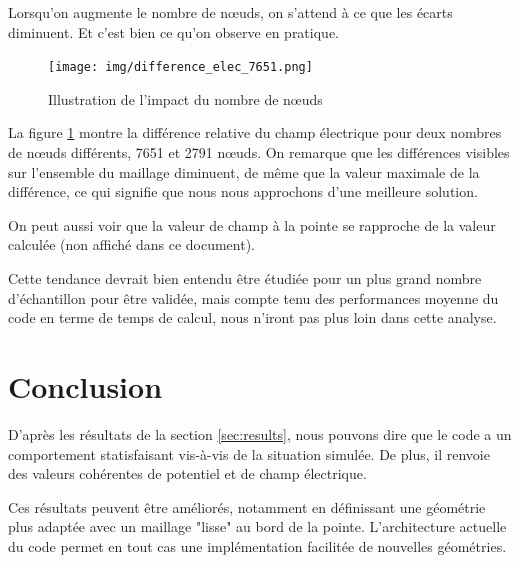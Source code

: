 \documentclass{article}
\begin{document}
Lorsqu'on augmente le nombre de nœuds, on s'attend à ce que les écarts
diminuent. Et c'est bien ce qu'on observe en pratique.

\begin{figure}[!h]
    \centering
    \texttt{[image: img/difference\_elec\_7651.png]}
    \caption{Illustration de l'impact du nombre de nœuds}
    \label{fig:nodes_number_impact}
\end{figure}

La figure \ref{fig:nodes_number_impact} montre la différence
relative du champ électrique pour deux nombres de nœuds
différents, 7651 et 2791 nœuds. On remarque que les
différences visibles sur l'ensemble du maillage diminuent,
de même que la valeur maximale de la différence, ce qui
signifie que nous nous approchons d'une meilleure solution.

On peut aussi voir que la valeur de champ à la pointe
se rapproche de la valeur calculée (non affiché dans ce document).

Cette tendance devrait bien entendu être étudiée pour un
plus grand nombre d'échantillon pour être validée,
mais compte tenu des performances moyenne du code
en terme de temps de calcul, nous
n'iront pas plus loin dans cette analyse.

\newpage

\section{Conclusion}

D'après les résultats de la section \ref{sec:results}, nous pouvons
dire que le code a un comportement statisfaisant vis-à-vis de la
situation simulée. De plus, il renvoie des valeurs cohérentes de
potentiel et de champ électrique.

Ces résultats peuvent être améliorés, notamment en définissant
une géométrie plus adaptée avec un maillage "lisse" au bord
de la pointe. L'architecture actuelle du code permet en tout
cas une implémentation facilitée de nouvelles géométries.

\printbibliography[title={Références}]
\end{document}
